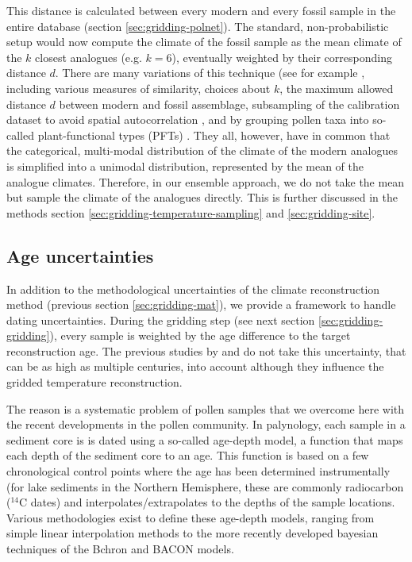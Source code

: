 \documentclass[
11pt, %
english, %
singlespacing, %
headsepline, %
]{MastersDoctoralThesis} %
\begin{document}
\begin{NoHyper}
\begin{refsection}
This distance is calculated between every modern and every fossil sample in the entire database (section \ref{sec:gridding-polnet}). The standard, non-probabilistic setup would now compute the climate of the fossil sample as the mean climate of the $k$ closest analogues (e.g. $k = 6$), eventually weighted by their corresponding distance $d$. There are many variations of this technique (see for example \cite{BirksHeiriSeppaeEtAl2010}, including various measures of similarity, choices about $k$, the maximum allowed distance $d$ between modern and fossil assemblage, subsampling of the calibration dataset to avoid spatial autocorrelation \citep{GuiotVernal2011, TelfordBirks2009, TelfordBirks2005}, and by grouping pollen taxa into so-called plant-functional types (PFTs) \citep[e.g.]{DavisBrewerStevensonEtAl2003, MauriDavisCollinsEtAl2015}. They all, however, have in common that the categorical, multi-modal distribution of the climate of the modern analogues is simplified into a unimodal distribution, represented by the mean of the analogue climates. Therefore, in our ensemble approach, we do not take the mean but sample the climate of the analogues directly. This is further discussed in the methods section \ref{sec:gridding-temperature-sampling} and \ref{sec:gridding-site}.


\subsection{Age uncertainties}  \label{sec:gridding-ageunc}
In addition to the methodological uncertainties of the climate reconstruction method (previous section \ref{sec:gridding-mat}), we provide a framework to handle dating uncertainties. During the gridding step (see next section \ref{sec:gridding-gridding}), every sample is weighted by the age difference to the target reconstruction age. The previous studies by \cite{DavisBrewerStevensonEtAl2003} and \cite{MauriDavisCollinsEtAl2015} do not take this uncertainty, that can be as high as multiple centuries, into account although they influence the gridded temperature reconstruction.

The reason is a systematic problem of pollen samples that we overcome here with the recent developments in the pollen community. In palynology, each sample in a sediment core is is dated using a so-called age-depth model, a function that maps each depth of the sediment core to an age. This function is based on a few chronological control points where the age has been determined instrumentally (for lake sediments in the Northern Hemisphere, these are commonly radiocarbon ($^{14}$C dates) and interpolates/extrapolates to the depths of the sample locations. Various methodologies exist to define these age-depth models, ranging from simple linear interpolation methods \citep{Bennett1994} to the more recently developed bayesian techniques of the Bchron \citep{HaslettParnell2008} and BACON \citep{BlaauwChristen2011} models.


\end{refsection}
\end{NoHyper}
\end{document}
